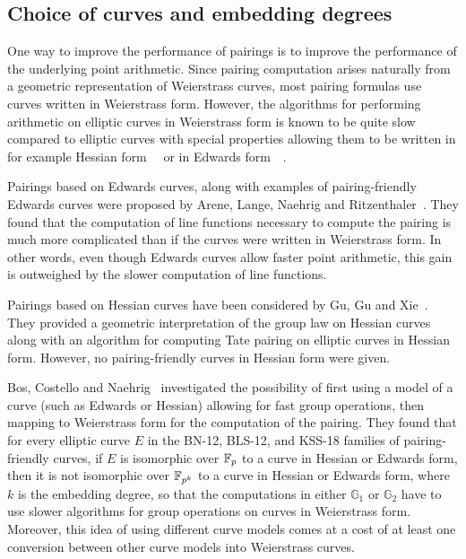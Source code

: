 
\subsection{Choice of curves and embedding degrees}

One way to improve the performance of pairings is
to improve the performance of the underlying point arithmetic.
Since pairing computation arises naturally from a geometric representation of Weierstrass curves,
most pairing formulas use curves written in Weierstrass form.
However, the algorithms for performing arithmetic on elliptic curves in Weierstrass form is known to be quite slow compared to elliptic curves with special properties allowing them to be written in
for example Hessian form~\cite{2001/smart}~\cite{2001/joye} or in
Edwards form~\cite{2007/edwards}~\cite{2007/bernstein-newelliptic}.

Pairings based on Edwards curves,
along with examples of pairing-friendly Edwards curves
were proposed by Arene, Lange, Naehrig and Ritzenthaler~\cite{2009/fastertate}.
They found that the computation of line functions necessary to compute the pairing is much more complicated than if the curves were written in Weierstrass form.
In other words,
even though Edwards curves allow faster point arithmetic,
this gain is outweighed by the slower computation of line functions.

Pairings based on Hessian curves have been considered by Gu, Gu and Xie~\cite{2010/Gu}.
They provided a geometric interpretation of the group law on Hessian curves
along with an algorithm for computing Tate pairing on elliptic curves in Hessian form.
However, no pairing-friendly curves in Hessian form were given.

Bos, Costello and Naehrig~\cite{2013/bos-pairing} investigated the possibility of first
using a model of a curve (such as Edwards or Hessian) allowing for fast group operations, then mapping to Weierstrass form for the computation of the pairing.
They found that for every elliptic curve $E$ in the BN-12, BLS-12, and KSS-18 families of pairing-friendly curves, if $E$ is isomorphic over $\mathbb{F}_{p}$ to a curve in Hessian or Edwards form, then it is not isomorphic over $\mathbb{F}_{p^{k}}$ to a curve in Hessian or Edwards form, where $k$ is the embedding degree, so that the computations in either $\mathbb{G}_1$ or $\mathbb{G}_2$ have to use slower algorithms for group operations on curves in Weierstrass form. Moreover, this idea of using different curve models comes at a cost of at least one conversion
between other curve models into Weierstrass curves.

